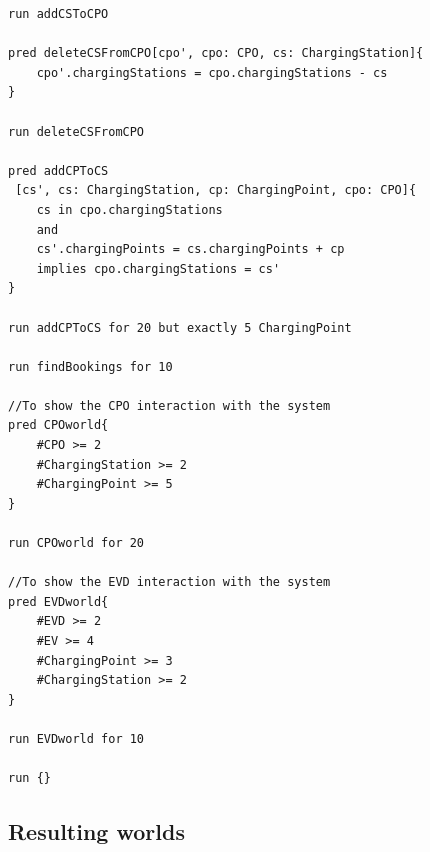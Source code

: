 \begin{lstlisting}[frame = single]
run addCSToCPO

pred deleteCSFromCPO[cpo', cpo: CPO, cs: ChargingStation]{
    cpo'.chargingStations = cpo.chargingStations - cs
}

run deleteCSFromCPO

pred addCPToCS
 [cs', cs: ChargingStation, cp: ChargingPoint, cpo: CPO]{
	cs in cpo.chargingStations
	and
	cs'.chargingPoints = cs.chargingPoints + cp 
	implies cpo.chargingStations = cs'
}

run addCPToCS for 20 but exactly 5 ChargingPoint

run findBookings for 10

//To show the CPO interaction with the system
pred CPOworld{
	#CPO >= 2
	#ChargingStation >= 2
	#ChargingPoint >= 5
}

run CPOworld for 20

//To show the EVD interaction with the system
pred EVDworld{
	#EVD >= 2
	#EV >= 4
	#ChargingPoint >= 3
	#ChargingStation >= 2
}

run EVDworld for 10

run {} 
\end{lstlisting}

\subsection{Resulting worlds}

